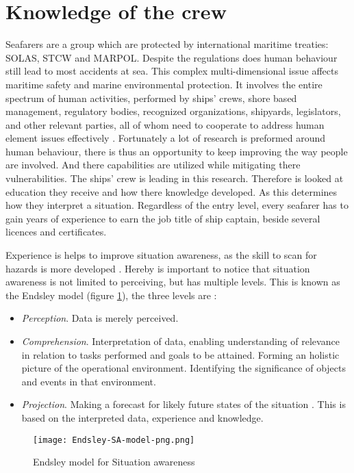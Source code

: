\section{Knowledge of the crew}
Seafarers are a group which are protected by international maritime treaties: \ac{SOLAS}, \ac{STCW} and \ac{MARPOL}. Despite the regulations does human behaviour still lead to most accidents at sea. This complex multi-dimensional issue affects maritime safety and marine environmental protection. It involves the entire spectrum of human activities, performed by ships' crews, shore based management, regulatory bodies, recognized organizations, shipyards, legislators, and other relevant parties, all of whom need to cooperate to address human element issues effectively \cite{IMO2017}.
Fortunately a lot of research is preformed around human behaviour, there is thus an opportunity to keep improving the way people are involved. And there capabilities are utilized while mitigating there vulnerabilities.
The ships' crew is leading in this research. Therefore is looked at education they receive and how there knowledge developed. As this determines how they interpret a situation.
Regardless of the entry level, every seafarer has to gain years of experience to earn the job title of ship captain, beside several licences and certificates. 

Experience is helps to improve situation awareness, as the skill to scan for hazards is more developed \cite{Underwood2013}. Hereby is important to notice that situation awareness is not limited to perceiving, but has multiple levels. This is known as the Endsley model (figure \ref{fig:Endsley-SA-model}), the three levels are \cite{Kalloniatis2017}: 
\begin{itemize}
	\item \emph{Perception}. Data is merely perceived.
	\item \emph{Comprehension}. Interpretation of data, enabling understanding of relevance in relation to tasks performed and goals to be attained. Forming an holistic picture of the operational environment. Identifying the significance of objects and events in that environment.
	\item \emph{Projection}. Making a forecast for likely future states of the situation . This is based on the interpreted data, experience and knowledge.
\end{itemize}

\begin{figure}[hb]
	\centering
	\texttt{[image: Endsley-SA-model-png.png]}
	\caption{Endsley model for Situation awareness}
	\label{fig:Endsley-SA-model}
\end{figure}

